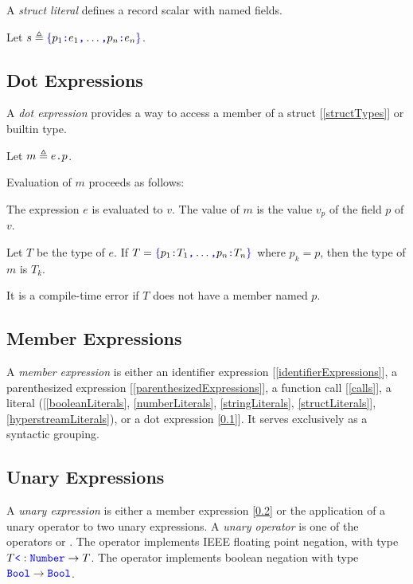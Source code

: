 \documentclass{article}
\begin{document}
A {\em struct literal} defines a record scalar with named fields.

\StructLiteral{}
\Property{}

Let $s \triangleq \texttt{\color{blue} $\{$}{}p_1\texttt{\color{blue} :}{} e_1\texttt{\color{blue} ,}{} \ldots \texttt{\color{blue} ,}{} p_n\texttt{\color{blue} :}{} e_n\texttt{\color{blue} $\}$}$.


\subsection{Dot Expressions}
\label{dotExpressions}

A {\em dot expression} provides a way to access a member of a struct [\ref{structTypes}] or builtin type.

\DotExpression{}

Let $m \triangleq e\texttt{\color{blue} .}{}p$.

Evaluation of $m$ proceeds as follows:

The expression $e$ is evaluated to $v$. The value of $m$ is the value $v_p$ of the field $p$ of $v$.

Let $T$ be the type of $e$. If $T = \texttt{\color{blue} $\{$}{}p_1\texttt{\color{blue} :}{} T_1\texttt{\color{blue} ,}{} \ldots\texttt{\color{blue} ,}{} p_n\texttt{\color{blue} :}{} T_n\texttt{\color{blue} $\}$}$ where $p_k = p$, then the type of $m$ is $T_k$. 

It is a compile-time error if $T$ does not have a member named $p$. 

\subsection{Member Expressions}
\label{memberExpression}

A {\em member expression} is either an identifier expression [\ref{identifierExpressions}], a parenthesized expression [\ref{parenthesizedExpressions}], a function call [\ref{calls}], a literal ([\ref{booleanLiterals}, \ref{numberLiterals}, \ref{stringLiterals}, \ref{structLiterals}], \ref{hyperstreamLiterals}), or a dot expression [\ref{dotExpressions}]]. It serves exclusively as a syntactic grouping.


\subsection{Unary Expressions}
\label{unaryExpressions}

A {\em unary expression} is either a member expression [\ref{memberExpression}] or the application of a unary operator to two unary expressions.
A {\em unary operator} is one of the operators \MINUS{} or  \NOT{}. The \MINUS{} operator implements IEEE floating point negation, with type $T \texttt{\color{blue} \tt<}: \texttt{\color{blue} Number}{} \to T$. The \NOT{} operator implements boolean negation with type $\texttt{\color{blue} Bool}{} \to \texttt{\color{blue} Bool}$.
\end{document}
